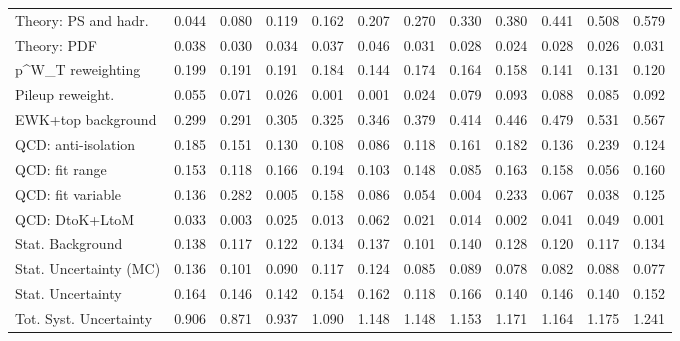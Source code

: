 \begin{tabular}{l|p{0.6cm}p{0.6cm}p{0.6cm}p{0.6cm}p{0.6cm}p{0.6cm}p{0.6cm}p{0.6cm}p{0.6cm}p{0.6cm}p{0.6cm}}
Theory: PS and hadr.                     & 0.044 & 0.080 & 0.119 & 0.162 & 0.207 & 0.270 & 0.330 & 0.380 & 0.441 & 0.508 & 0.579 \\
Theory: PDF                              & 0.038 & 0.030 & 0.034 & 0.037 & 0.046 & 0.031 & 0.028 & 0.024 & 0.028 & 0.026 & 0.031 \\
p^{W}_{T} reweighting                    & 0.199 & 0.191 & 0.191 & 0.184 & 0.144 & 0.174 & 0.164 & 0.158 & 0.141 & 0.131 & 0.120 \\
Pileup reweight.                         & 0.055 & 0.071 & 0.026 & 0.001 & 0.001 & 0.024 & 0.079 & 0.093 & 0.088 & 0.085 & 0.092 \\
EWK+top background                       & 0.299 & 0.291 & 0.305 & 0.325 & 0.346 & 0.379 & 0.414 & 0.446 & 0.479 & 0.531 & 0.567 \\
QCD: anti-isolation                      & 0.185 & 0.151 & 0.130 & 0.108 & 0.086 & 0.118 & 0.161 & 0.182 & 0.136 & 0.239 & 0.124 \\
QCD: fit range                           & 0.153 & 0.118 & 0.166 & 0.194 & 0.103 & 0.148 & 0.085 & 0.163 & 0.158 & 0.056 & 0.160 \\
QCD: fit variable                        & 0.136 & 0.282 & 0.005 & 0.158 & 0.086 & 0.054 & 0.004 & 0.233 & 0.067 & 0.038 & 0.125 \\
QCD: DtoK+LtoM                           & 0.033 & 0.003 & 0.025 & 0.013 & 0.062 & 0.021 & 0.014 & 0.002 & 0.041 & 0.049 & 0.001 \\
Stat. Background                         & 0.138 & 0.117 & 0.122 & 0.134 & 0.137 & 0.101 & 0.140 & 0.128 & 0.120 & 0.117 & 0.134 \\
Stat. Uncertainty (MC)                   & 0.136 & 0.101 & 0.090 & 0.117 & 0.124 & 0.085 & 0.089 & 0.078 & 0.082 & 0.088 & 0.077 \\
\hline
Stat. Uncertainty                        & 0.164 & 0.146 & 0.142 & 0.154 & 0.162 & 0.118 & 0.166 & 0.140 & 0.146 & 0.140 & 0.152 \\
\hline
Tot. Syst. Uncertainty                   & 0.906 & 0.871 & 0.937 & 1.090 & 1.148 & 1.148 & 1.153 & 1.171 & 1.164 & 1.175 & 1.241 \\
\hline
\end{tabular}

